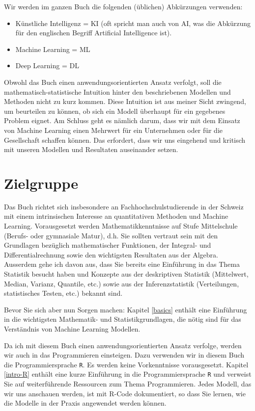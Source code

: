 \documentclass[
]{book}
\providecommand{\tightlist}{%
  \setlength{\itemsep}{0pt}\setlength{\parskip}{0pt}}
\begin{document}
Wir werden im ganzen Buch die folgenden (üblichen) Abkürzungen verwenden:

\begin{itemize}
\tightlist
\item
  Künstliche Intelligenz = KI (oft spricht man auch von AI, was die Abkürzung für den englischen Begriff Artificial Intelligence ist).
\item
  Machine Learning = ML
\item
  Deep Learning = DL
\end{itemize}

Obwohl das Buch einen anwendungsorientierten Ansatz verfolgt, soll die mathematisch-statistische Intuition hinter den beschriebenen Modellen und Methoden nicht zu kurz kommen. Diese Intuition ist aus meiner Sicht zwingend, um beurteilen zu können, ob sich ein Modell überhaupt für ein gegebenes Problem eignet. Am Schluss geht es nämlich darum, dass wir mit dem Einsatz von Machine Learning einen Mehrwert für ein Unternehmen oder für die Gesellschaft schaffen können. Das erfordert, dass wir uns eingehend und kritisch mit unseren Modellen und Resultaten auseinander setzen.

\hypertarget{zielgruppe}{%
\section*{Zielgruppe}\label{zielgruppe}}

Das Buch richtet sich insbesondere an Fachhochschulstudierende in der Schweiz mit einem intrinsischen Interesse an quantitativen Methoden und Machine Learning. Vorausgesetzt werden Mathematikkenntnisse auf Stufe Mittelschule (Berufs- oder gymnasiale Matur), d.h. Sie sollten vertraut sein mit den Grundlagen bezüglich mathematischer Funktionen, der Integral- und Differentialrechnung sowie den wichtigsten Resultaten aus der Algebra. Ausserdem gehe ich davon aus, dass Sie bereits eine Einführung in das Thema Statistik besucht haben und Konzepte aus der deskriptiven Statistik (Mittelwert, Median, Varianz, Quantile, etc.) sowie aus der Inferenzstatistik (Verteilungen, statistisches Testen, etc.) bekannt sind.

Bevor Sie sich aber nun Sorgen machen: Kapitel \ref{basics} enthält eine Einführung in die wichtigsten Mathematik- und Statistikgrundlagen, die nötig sind für das Verständnis von Machine Learning Modellen.

Da ich mit diesem Buch einen anwendungsorientierten Ansatz verfolge, werden wir auch in das Programmieren einsteigen. Dazu verwenden wir in diesem Buch die Programmiersprache \texttt{R}. Es werden keine Vorkenntnisse vorausgesetzt. Kapitel \ref{intro-R} enthält eine kurze Einführung in die Programmiersprache \texttt{R} und verweist Sie auf weiterführende Ressourcen zum Thema Programmieren. Jedes Modell, das wir uns anschauen werden, ist mit R-Code dokumentiert, so dass Sie lernen, wie die Modelle in der Praxis angewendet werden können.
\end{document}
